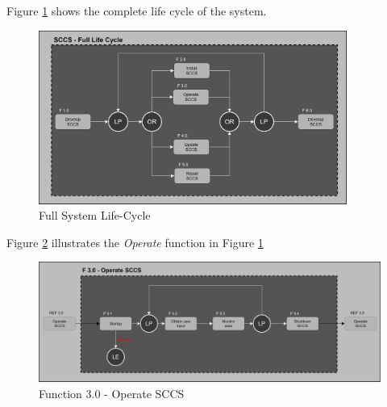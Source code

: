 \documentclass[a4paper,12pt]{article}
\numberwithin{equation}{section}
\numberwithin{figure}{section}
\numberwithin{table}{section}
\begin{document}
Figure \ref{prelim_functFlow_full_life_cycle} shows the complete life cycle of the system.

\begin{figure}[h!]
    \centering %
    \includegraphics[padding=1ex,width=0.9\textwidth,frame]{img/prelim_functFlow_full_life_cycle.png}
    \caption{Full System Life-Cycle}
    \label{prelim_functFlow_full_life_cycle}
\end{figure}



Figure \ref{prelim_functFlow_F3_operate} illustrates the \textit{Operate} function in Figure \ref{prelim_functFlow_full_life_cycle}

\begin{figure}[h!]
    \centering %
    \includegraphics[padding=1ex,width=1.0\textwidth,frame]{img/prelim_functFlow_F3_operate.png}
    \caption{Function 3.0 - Operate SCCS}
    \label{prelim_functFlow_F3_operate}
\end{figure}
\end{document}

